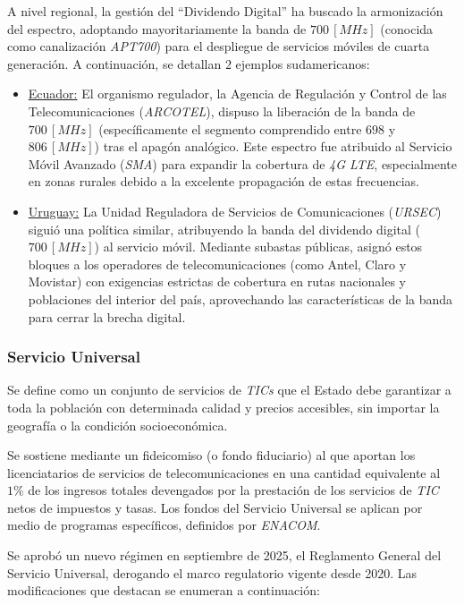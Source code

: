 \documentclass[12pt]{article}
\begin{document}
A nivel regional, la gestión del ``Dividendo Digital'' ha buscado la armonización del espectro, adoptando mayoritariamente la banda de $700 \, [MHz]$ (conocida como canalización \textit{APT700}) para el despliegue de servicios móviles de cuarta generación. A continuación, se detallan $2$ ejemplos sudamericanos:
\begin{itemize}
    \item \underline{Ecuador:} El organismo regulador, la Agencia de Regulación y Control de las Telecomunicaciones (\textit{ARCOTEL}), dispuso la liberación de la banda de $700 \, [MHz]$ (específicamente el segmento comprendido entre $698$ y $806 \, [MHz]$) tras el apagón analógico. Este espectro fue atribuido al Servicio Móvil Avanzado (\textit{SMA}) para expandir la cobertura de \textit{4G LTE}, especialmente en zonas rurales debido a la excelente propagación de estas frecuencias. \cite{b5.1}
    
    \item \underline{Uruguay:} La Unidad Reguladora de Servicios de Comunicaciones (\textit{URSEC}) siguió una política similar, atribuyendo la banda del dividendo digital ($700 \, [MHz]$) al servicio móvil. Mediante subastas públicas, asignó estos bloques a los operadores de telecomunicaciones (como Antel, Claro y Movistar) con exigencias estrictas de cobertura en rutas nacionales y poblaciones del interior del país, aprovechando las características de la banda para cerrar la brecha digital. \cite{b5.2}
\end{itemize}



\subsubsection{Servicio Universal}
\label{sec_2.3.2}
Se define como un conjunto de servicios de \textit{TICs} que el Estado debe garantizar a toda la población con determinada calidad y precios accesibles, sin importar la geografía o la condición socioeconómica.

Se sostiene mediante un fideicomiso (o fondo fiduciario) al que aportan los licenciatarios de servicios de telecomunicaciones en una cantidad equivalente al $1\%$ de los ingresos totales devengados por la prestación de los servicios de \textit{TIC} netos de impuestos y tasas. Los fondos del Servicio Universal se aplican por medio de programas específicos, definidos por \textit{ENACOM}. \cite{b6}

Se aprobó un nuevo régimen en septiembre de 2025, el Reglamento General del Servicio Universal, derogando el marco regulatorio vigente desde 2020. Las modificaciones que destacan se enumeran a continuación:
\end{document}
